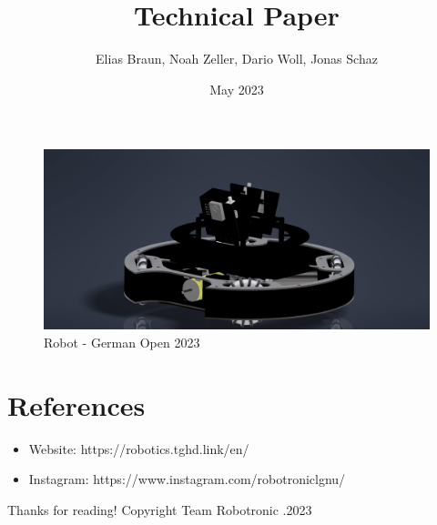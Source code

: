 \documentclass{scrartcl}
\title{Technical Paper}
\author{Elias Braun, Noah Zeller, Dario Woll, Jonas Schaz}
\date{May 2023}
\begin{document}
\maketitle

\begin{figure}[h]
    \centering
    \includegraphics[width=\textwidth]{img/inv/robot.jpg}
    \caption{Robot - German Open 2023}
    \label{fig:robots}
\end{figure}
\newpage

\tableofcontents
\newpage









\section{References}
\begin{itemize}
    \item Website: https://robotics.tghd.link/en/
    \item Instagram: https://www.instagram.com/robotroniclgnu/
\end{itemize}


Thanks for reading!
\newline
\newline
\newline
\newline
Copyright \newline
Team Robotronic
.2023
\end{document}
